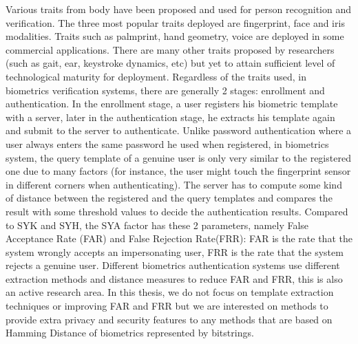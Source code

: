 Various traits from body have been proposed and used for person recognition and
verification. The three most popular traits deployed are fingerprint, face and
iris modalities. Traits such as palmprint, hand geometry, voice are deployed in
some commercial applications. There are many other traits proposed by
researchers (such as gait, ear, keystroke dynamics, etc) but yet to attain
sufficient level of technological maturity for deployment. Regardless of the
traits used, in biometrics verification systems, there are generally 2 stages:
enrollment and authentication. In the enrollment stage, a user registers his
biometric template with a server, later in the authentication stage, he extracts
his template again and submit to the server to authenticate. Unlike password
authentication where a user always enters the same password he used when
registered, in biometrics system, the query template of a genuine user is only
very similar to the registered one due to many factors (for instance, the user
might touch the fingerprint sensor in different corners when
authenticating). The server has to compute some kind of distance between the
registered and the query templates and compares the result with some threshold
values to decide the authentication results. Compared to SYK and SYH, the SYA
factor has these 2 parameters, namely False Acceptance Rate (FAR) and False
Rejection Rate(FRR): FAR is the rate that the system wrongly accepts an
impersonating user, FRR is the rate that the system rejects a genuine
user. Different biometrics authentication systems use different extraction
methods and distance measures to reduce FAR and FRR, this is also an active
research area. In this thesis, we do not focus on template extraction techniques
or improving FAR and FRR but we are interested on methods to provide extra
privacy and security features to any methods that are based on Hamming Distance
of biometrics represented by bitstrings.


